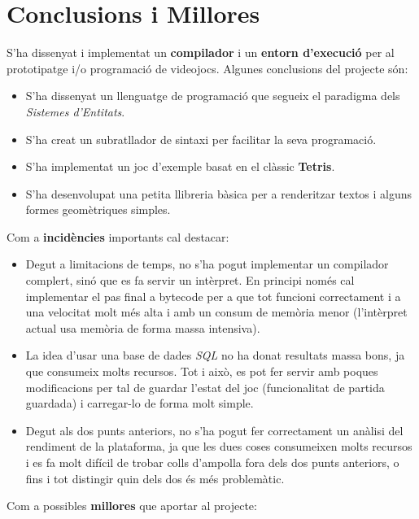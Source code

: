 \chapter{Conclusions i Millores}

S'ha dissenyat i implementat un {\bf compilador} i un {\bf entorn d'execució} per al prototipatge i/o programació de videojocs. Algunes conclusions del projecte són:

\begin{itemize}
  \item S'ha dissenyat un llenguatge de programació que segueix el paradigma dels {\em Sistemes d'Entitats}.
  \item S'ha creat un subratllador de sintaxi per facilitar la seva programació.
  \item S'ha implementat un joc d'exemple basat en el clàssic {\bf Tetris}.
  \item S'ha desenvolupat una petita llibreria bàsica per a renderitzar textos i alguns formes geomètriques simples.
\end{itemize}

Com a {\bf incidències} importants cal destacar:

\begin{itemize}
  \item Degut a limitacions de temps, no s'ha pogut implementar un compilador complert, sinó que es fa servir un intèrpret. En principi només cal implementar el pas final a bytecode per a que tot funcioni correctament i a una velocitat molt més alta i amb un consum de memòria menor (l'intèrpret actual usa memòria de forma massa intensiva).
  \item La idea d'usar una base de dades {\em SQL} no ha donat resultats massa bons, ja que consumeix molts recursos. Tot i això, es pot fer servir amb poques modificacions per tal de guardar l'estat del joc (funcionalitat de partida guardada) i carregar-lo de forma molt simple.
  \item Degut als dos punts anteriors, no s'ha pogut fer correctament un anàlisi del rendiment de la plataforma, ja que les dues coses consumeixen molts recursos i es fa molt difícil de trobar colls d'ampolla fora dels dos punts anteriors, o fins i tot distingir quin dels dos és més problemàtic.
\end{itemize}

Com a possibles {\bf millores} que aportar al projecte:

